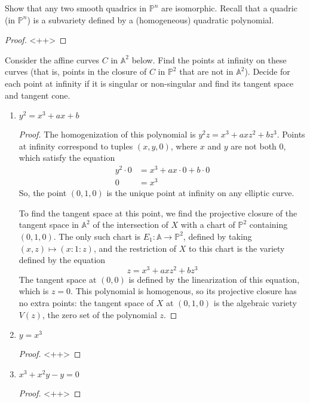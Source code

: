 \documentclass[12pt]{article}
\theoremstyle{definition}
\newenvironment{problem}[2][Problem]{\begin{trivlist}
\item[\hskip \labelsep {\bfseries #1}\hskip \labelsep {\bfseries #2.}]}{\end{trivlist}}
\begin{document}
\begin{problem}{3}
	Show that any two smooth quadrics in $\mathbb P^n$ are isomorphic. Recall that a quadric (in $\mathbb P^n$) is a subvariety defined by a (homogeneous) quadratic polynomial.
	\begin{proof}
		<++>
	\end{proof}
\end{problem}
\begin{problem}{4}
	Consider the affine curves $C$ in $\mathbb A^2$ below. Find the points at infinity on these curves (that is, points in the closure of $C$ in $\mathbb P^2$ that are not in $\mathbb A^2$). Decide for each point at infinity if it is singular or non-singular and find its tangent space and tangent cone.
	\begin{enumerate}
		\item $y^2 = x^3 + ax + b$
			\begin{proof}
				The homogenization of this polynomial is $y^2z = x^3 + axz^2 + bz^3$. Points at infinity correspond to tuples $(x,y,0)$, where $x$ and $y$ are not both $0$, which satisfy the equation
				\begin{align*}
					y^2 \cdot 0 &= x^3 + ax \cdot 0 + b \cdot 0\\
					0 &= x^3
				\end{align*}
				So, the point $(0,1,0)$ is the unique point at infinity on any elliptic curve.
				\par To find the tangent space at this point, we find the projective closure of the tangent space in $\mathbb A^2$ of the intersection of $X$ with a chart of $\mathbb P^2$ containing $(0,1,0)$. The only such chart is $E_1: \mathbb A \to \mathbb P^2$, defined by taking $(x,z) \mapsto (x:1:z)$, and the restriction of $X$ to this chart is the variety defined by the equation
				\[z = x^3 + axz^2 + bz^3\]
				The tangent space at $(0,0)$ is defined by the linearization of this equation, which is $z = 0$. This polynomial is homogenous, so its projective closure has no extra points: the tangent space of $X$ at $(0,1,0)$ is the algebraic variety $V(z)$, the zero set of the polynomial $z$.
			\end{proof}
		\item $y = x^3$
			\begin{proof}
				<++>
			\end{proof}
		\item $x^3 + x^2y - y = 0$
			\begin{proof}
				<++>
			\end{proof}
	\end{enumerate}
\end{problem}
\end{document}
